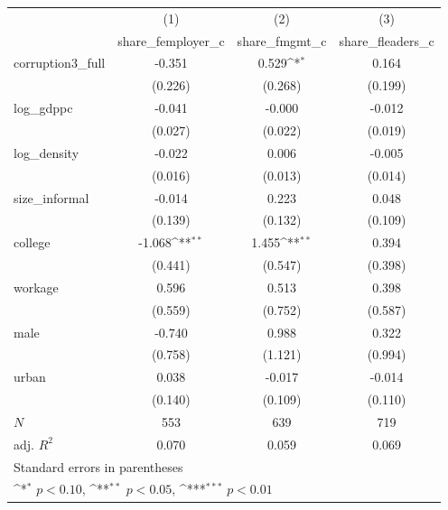 {
\def\sym#1{\ifmmode^{#1}\else\(^{#1}\)\fi}
\begin{tabular}{l*{3}{c}}
\hline\hline
            &\multicolumn{1}{c}{(1)}&\multicolumn{1}{c}{(2)}&\multicolumn{1}{c}{(3)}\\
            &\multicolumn{1}{c}{share\_femployer\_c}&\multicolumn{1}{c}{share\_fmgmt\_c}&\multicolumn{1}{c}{share\_fleaders\_c}\\
\hline
corruption3\_full&      -0.351         &       0.529\sym{*}  &       0.164         \\
            &     (0.226)         &     (0.268)         &     (0.199)         \\
[1em]
log\_gdppc   &      -0.041         &      -0.000         &      -0.012         \\
            &     (0.027)         &     (0.022)         &     (0.019)         \\
[1em]
log\_density &      -0.022         &       0.006         &      -0.005         \\
            &     (0.016)         &     (0.013)         &     (0.014)         \\
[1em]
size\_informal&      -0.014         &       0.223         &       0.048         \\
            &     (0.139)         &     (0.132)         &     (0.109)         \\
[1em]
college     &      -1.068\sym{**} &       1.455\sym{**} &       0.394         \\
            &     (0.441)         &     (0.547)         &     (0.398)         \\
[1em]
workage     &       0.596         &       0.513         &       0.398         \\
            &     (0.559)         &     (0.752)         &     (0.587)         \\
[1em]
male        &      -0.740         &       0.988         &       0.322         \\
            &     (0.758)         &     (1.121)         &     (0.994)         \\
[1em]
urban       &       0.038         &      -0.017         &      -0.014         \\
            &     (0.140)         &     (0.109)         &     (0.110)         \\
\hline
\(N\)       &         553         &         639         &         719         \\
adj. \(R^{2}\)&       0.070         &       0.059         &       0.069         \\
\hline\hline
\multicolumn{4}{l}{\footnotesize Standard errors in parentheses}\\
\multicolumn{4}{l}{\footnotesize \sym{*} \(p<0.10\), \sym{**} \(p<0.05\), \sym{***} \(p<0.01\)}\\
\end{tabular}
}
